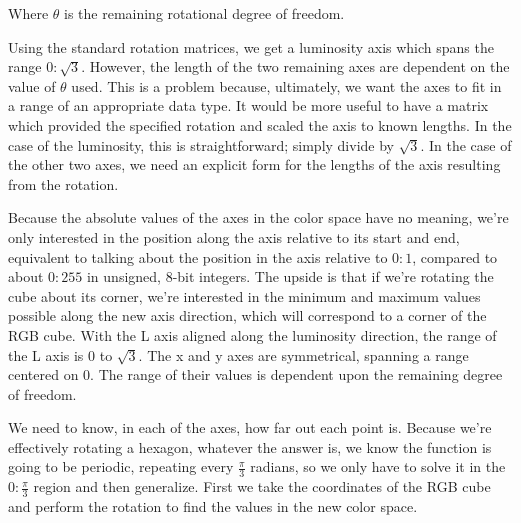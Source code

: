 






Where $\theta$ is the remaining rotational degree of freedom.



Using the standard rotation matrices, we get a luminosity axis which spans the range $0:\sqrt{3}$. However, the length of the two remaining axes are dependent on the value of $\theta$ used. This is a problem because, ultimately, we want the axes to fit in a range of an appropriate data type. It would be more useful to have a matrix which provided the specified rotation and scaled the axis to known lengths. In the case of the luminosity, this is straightforward; simply divide by $\sqrt{3}$. In the case of the other two axes, we need an explicit form for the lengths of the axis resulting from the rotation.



Because the absolute values of the axes in the color space have no meaning, we're only interested in the position along the axis relative to its start and end, equivalent to talking about the position in the axis relative to $0:1$, compared to about $0:255$ in unsigned, 8-bit integers. The upside is that if we're rotating the cube about its corner, we're interested in the minimum and maximum values possible along the new axis direction, which will correspond to a corner of the RGB cube. With the L axis aligned along the luminosity direction, the range of the L axis is 0 to $\sqrt{3}$. The x and y axes are symmetrical, spanning a range centered on 0. The range of their values is dependent upon the remaining degree of freedom.



We need to know, in each of the axes, how far out each point is. Because we're effectively rotating a hexagon, whatever the answer is, we know the function is going to be periodic, repeating every $\frac{\pi}{3}$ radians, so we only have to solve it in the $0:\frac{\pi}{3}$ region and then generalize. First we take the coordinates of the RGB cube and perform the rotation to find the values in the new color space.



